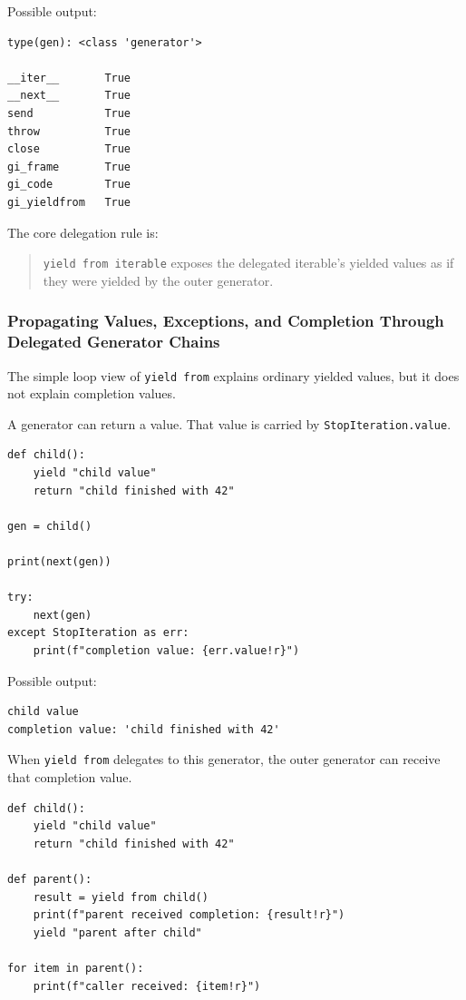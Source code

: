 Possible output:

\begin{verbatim}
type(gen): <class 'generator'>

__iter__       True
__next__       True
send           True
throw          True
close          True
gi_frame       True
gi_code        True
gi_yieldfrom   True
\end{verbatim}

The core delegation rule is:

\begin{quote}
\texttt{yield from iterable} exposes the delegated iterable's yielded values as if they were yielded by the outer generator.
\end{quote}

\subsubsection{Propagating Values, Exceptions, and Completion Through Delegated Generator Chains}

The simple loop view of \texttt{yield from} explains ordinary yielded values, but it does not explain completion values.

A generator can return a value. That value is carried by \texttt{StopIteration.value}.

\begin{verbatim}
def child():
    yield "child value"
    return "child finished with 42"

gen = child()

print(next(gen))

try:
    next(gen)
except StopIteration as err:
    print(f"completion value: {err.value!r}")
\end{verbatim}

Possible output:

\begin{verbatim}
child value
completion value: 'child finished with 42'
\end{verbatim}

When \texttt{yield from} delegates to this generator, the outer generator can receive that completion value.

\begin{verbatim}
def child():
    yield "child value"
    return "child finished with 42"

def parent():
    result = yield from child()
    print(f"parent received completion: {result!r}")
    yield "parent after child"

for item in parent():
    print(f"caller received: {item!r}")
\end{verbatim}

